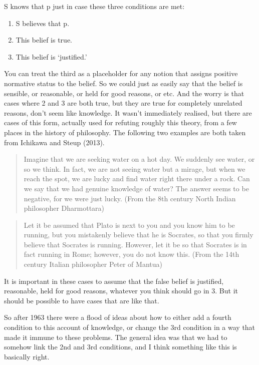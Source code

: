 \documentclass[
]{article}
\providecommand{\tightlist}{%
  \setlength{\itemsep}{0pt}\setlength{\parskip}{0pt}}
\begin{document}
S knows that p just in case these three conditions are met:

\begin{enumerate}
\def\labelenumi{\arabic{enumi}.}
\tightlist
\item
  S believes that p.
\item
  This belief is true.
\item
  This belief is `justified.'
\end{enumerate}

You can treat the third as a placeholder for any notion that assigns
positive normative status to the belief. So we could just as easily say
that the belief is sensible, or reasonable, or held for good reasons, or
etc. And the worry is that cases where 2 and 3 are both true, but they
are true for completely unrelated reasons, don't seem like knowledge. It
wasn't immediately realised, but there are cases of this form, actually
used for refuting roughly this theory, from a few places in the history
of philosophy. The following two examples are both taken from Ichikawa
and Steup (2013).

\begin{quote}
Imagine that we are seeking water on a hot day. We suddenly see water,
or so we think. In fact, we are not seeing water but a mirage, but when
we reach the spot, we are lucky and find water right there under a rock.
Can we say that we had genuine knowledge of water? The answer seems to
be negative, for we were just lucky. (From the 8th century North Indian
philosopher Dharmottara)
\end{quote}

\begin{quote}
Let it be assumed that Plato is next to you and you know him to be
running, but you mistakenly believe that he is Socrates, so that you
firmly believe that Socrates is running. However, let it be so that
Socrates is in fact running in Rome; however, you do not know this.
(From the 14th century Italian philosopher Peter of Mantua)
\end{quote}

It is important in these cases to assume that the false belief is
justified, reasonable, held for good reasons, whatever you think should
go in 3. But it should be possible to have cases that are like that.

So after 1963 there were a flood of ideas about how to either add a
fourth condition to this account of knowledge, or change the 3rd
condition in a way that made it immune to these problems. The general
idea was that we had to somehow link the 2nd and 3rd conditions, and I
think something like this is basically right.
\end{document}

